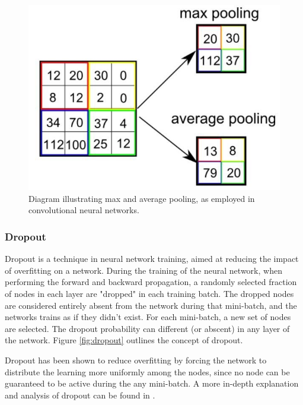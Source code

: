\documentclass[10pt, twocolumn]{article}
\begin{document}
\begin{figure}[H]
    \centering    
    \includegraphics[scale=0.25]{../figs/pooling.png}
    \caption{Diagram illustrating max and average pooling, as employed in convolutional neural networks.}
    \label{fig:pooling}
\end{figure}





\subsubsection{Dropout}
\label{sec:theory_dropout}
Dropout is a technique in neural network training, aimed at reducing the impact of overfitting on a network. During the training of the neural network, when performing the forward and backward propagation, a randomly selected fraction of nodes in each layer are "dropped" in each training batch. The dropped nodes are considered entirely absent from the network during that mini-batch, and the networks trains as if they didn't exist. For each mini-batch, a new set of nodes are selected. The dropout probability can different (or abscent) in any layer of the network. Figure \ref{fig:dropout} outlines the concept of dropout.

Dropout has been shown to reduce overfitting by forcing the network to distribute the learning more uniformly among the nodes, since no node can be guaranteed to be active during the any mini-batch. A more in-depth explanation and analysis of dropout can be found in \cite{dropout}.
\end{document}
